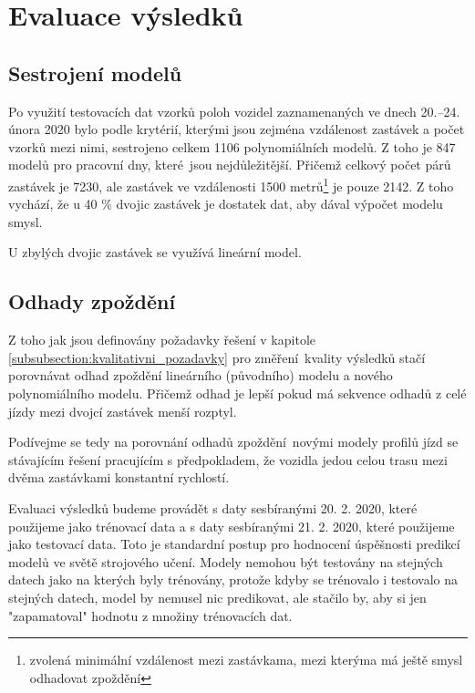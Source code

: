 \bigbreak



\section{Evaluace výsledků}

\subsection{Sestrojení modelů}

Po využití testovacích dat vzorků poloh vozidel zaznamenaných ve dnech 20.--24. února 2020 bylo podle krytérií, kterými jsou zejména vzdálenost zastávek a počet vzorků mezi nimi, sestrojeno celkem 1106 polynomiálních modelů. Z toho je 847 modelů pro pracovní dny, které jsou nejdůležitější. Přičemž celkový počet párů zastávek je 7230, ale zastávek ve vzdálenosti 1500 metrů\footnote{zvolená minimální vzdálenost mezi zastávkama, mezi kterýma má ještě smysl odhadovat zpoždění} je pouze 2142. Z toho vychází, že u 40 \% dvojic zastávek je dostatek dat, aby dával výpočet modelu smysl.

\bigbreak

U zbylých dvojic zastávek se využívá lineární model.

\subsection{Odhady zpoždění}

Z toho jak jsou definovány požadavky řešení v kapitole \ref{subsubsection:kvalitativni_pozadavky} pro změření kvality výsledků stačí porovnávat odhad zpoždění lineárního (původního) modelu a nového polynomiálního modelu. Přičemž odhad je lepší pokud má sekvence odhadů  z celé jízdy mezi dvojcí zastávek menší rozptyl.

\bigbreak

Podívejme se tedy na porovnání odhadů zpoždění novými modely profilů jízd se stávajícím řešení pracujícím s předpokladem, že vozidla jedou celou trasu mezi dvěma zastávkami konstantní rychlostí.

\bigbreak

Evaluaci výsledků budeme provádět s daty sesbíranými 20. 2. 2020, které použijeme jako trénovací data a s daty sesbíranými 21. 2. 2020, které použijeme jako testovací data. Toto je standardní postup pro hodnocení úspěšnosti predikcí modelů ve světě strojového učení. Modely nemohou být testovány na stejných datech jako na kterých byly trénovány, protože kdyby se trénovalo i testovalo na stejných datech, model by nemusel nic predikovat, ale stačilo by, aby si jen "zapamatoval" hodnotu z množiny trénovacích dat.

\bigbreak
